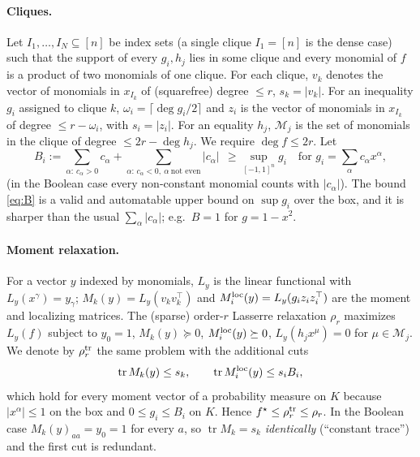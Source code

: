 \documentclass[a4paper,11pt]{article}
\theoremstyle{plain}
\theoremstyle{definition}
\theoremstyle{remark}
\newcommand{\tr}{\operatorname{tr}}
\begin{document}
\paragraph{Cliques.} Let $I_1,\dots,I_N\subseteq[n]$ be index sets (a single clique $I_1=[n]$ is the dense case) such that the support of every $g_i,h_j$ lies in some clique and every monomial of $f$ is a product of two monomials of one clique. For each clique, $v_k$ denotes the vector of monomials in $x_{I_k}$ of (squarefree) degree $\le r$, $s_k=|v_k|$. For an inequality $g_i$ assigned to clique $k$, $\omega_i=\lceil\deg g_i/2\rceil$ and $z_i$ is the vector of monomials in $x_{I_k}$ of degree $\le r-\omega_i$, with $s_i=|z_i|$. For an equality $h_j$, $\mathcal M_j$ is the set of monomials in the clique of degree $\le 2r-\deg h_j$. We require $\deg f\le 2r$. Let
\begin{equation}\label{eq:B}
B_i:=\sum_{\alpha:\,c_\alpha>0}c_\alpha+\sum_{\alpha:\,c_\alpha<0,\ \alpha\ \text{not even}}|c_\alpha|\ \ \ge \sup_{[-1,1]^n}g_i\quad\text{for } g_i=\sum_\alpha c_\alpha x^\alpha,
\end{equation}
(in the Boolean case every non-constant monomial counts with $|c_\alpha|$). The bound \eqref{eq:B} is a valid and automatable upper bound on $\sup g_i$ over the box, and it is sharper than the usual $\sum_\alpha|c_\alpha|$; e.g.\ $B=1$ for $g=1-x^2$.

\paragraph{Moment relaxation.} For a vector $y$ indexed by monomials, $L_y$ is the linear functional with $L_y(x^\gamma)=y_\gamma$; $M_k(y)=L_y(v_kv_k^\top)$ and $M_i^{\rm loc}(y)=L_y(g_iz_iz_i^\top)$ are the moment and localizing matrices. The (sparse) order-$r$ Lasserre relaxation $\rho_r$ maximizes $L_y(f)$ subject to $y_0=1$, $M_k(y)\succeq0$, $M^{\rm loc}_i(y)\succeq0$, $L_y(h_jx^\mu)=0$ for $\mu\in\mathcal M_j$. We denote by $\rho_r^{\rm tr}$ the same problem with the additional cuts
\begin{equation}\label{eq:cuts}
\tr M_k(y)\le s_k,\qquad \tr M_i^{\rm loc}(y)\le s_iB_i,
\end{equation}
which hold for every moment vector of a probability measure on $K$ because $|x^\alpha|\le1$ on the box and $0\le g_i\le B_i$ on $K$. Hence $f^\star\le\rho_r^{\rm tr}\le\rho_r$. In the Boolean case $M_k(y)_{aa}=y_0=1$ for every $a$, so $\tr M_k=s_k$ \emph{identically} (``constant trace'') and the first cut is redundant.
\end{document}
